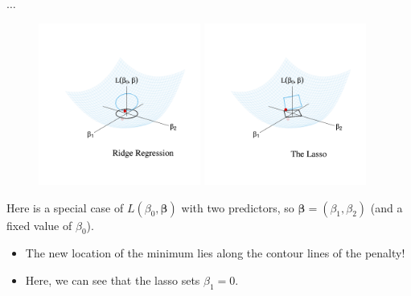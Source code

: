\documentclass[8pt]{beamer}
\begin{document}
\begin{frame}{$\ldots$}

\begin{figure}
    \centering
    \includegraphics[trim = 50 75 25 75, clip, width = 0.475\textwidth]{min_ridge.pdf}
    \includegraphics[trim = 50 75 25 75, clip, width = 0.475\textwidth]{min_lasso.pdf}
\end{figure}

Here is a special case of $L(\beta_0, \bm{\beta})$ with two predictors, so $\bm{\beta} = (\beta_1,\beta_2)$ (and a fixed value of $\beta_0$).
\begin{itemize}
    \item The new location of the minimum lies along the contour lines of the penalty! 
    \item Here, we can see that the lasso sets $\beta_1 = 0$. %
\end{itemize}
    
\end{frame}
\end{document}
